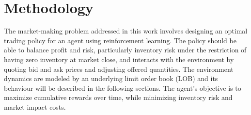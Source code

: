 \section{Methodology}
\label{sec:methodology}


The market-making problem addressed in this work involves designing an optimal trading policy for an agent using reinforcement learning.
The policy should be able to balance profit and risk, particularly inventory risk under the restriction of having zero inventory at market close,
and interacts with the environment by quoting bid and ask prices and adjusting offered quantities.
The environment dynamics are modeled by an underlying limit order book (LOB) and its behaviour will be described in the following sections.
The agent's objective is to maximize cumulative rewards over time, while minimizing inventory risk and market impact costs.






